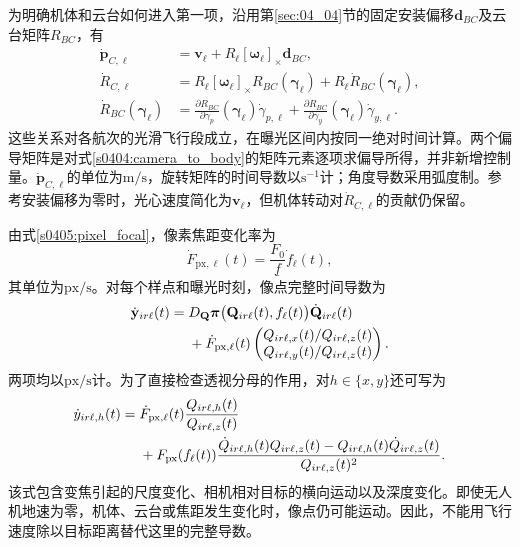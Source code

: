 为明确机体和云台如何进入第一项，沿用第\ref{sec:04_04}节的固定安装偏移$\mathbf d_{BC}$及云台矩阵$R_{BC}$，有
\begin{subequations}
\label{s0405:camera_pose_rates}
\begin{align}
 \dot{\mathbf p}_{C,\ell}
 &=\mathbf v_\ell
   +R_\ell[\boldsymbol\omega_\ell]_\times\mathbf d_{BC},
 \label{s0405:camera_translation_rate}\\
 \dot R_{C,\ell}
 &=R_\ell[\boldsymbol\omega_\ell]_\times
   R_{BC}(\boldsymbol\gamma_\ell)
   +R_\ell\dot R_{BC}(\boldsymbol\gamma_\ell),
 \label{s0405:camera_rotation_rate}\\
 \dot R_{BC}(\boldsymbol\gamma_\ell)
 &=\frac{\partial R_{BC}}{\partial\gamma_p}
      (\boldsymbol\gamma_\ell)\dot\gamma_{p,\ell}
  +\frac{\partial R_{BC}}{\partial\gamma_y}
      (\boldsymbol\gamma_\ell)\dot\gamma_{y,\ell}.
 \label{s0405:gimbal_rotation_rate}
\end{align}
\end{subequations}
这些关系对各航次的光滑飞行段成立，在曝光区间内按同一绝对时间计算。两个偏导矩阵是对式\eqref{s0404:camera_to_body}的矩阵元素逐项求偏导所得，并非新增控制量。$\dot{\mathbf p}_{C,\ell}$的单位为$\mathrm{m/s}$，旋转矩阵的时间导数以$\mathrm{s^{-1}}$计；角度导数采用弧度制。参考安装偏移为零时，光心速度简化为$\mathbf v_\ell$，但机体转动对$\dot R_{C,\ell}$的贡献仍保留。

由式\eqref{s0405:pixel_focal}，像素焦距变化率为
\begin{equation}
 \dot F_{\mathrm{px},\ell}(t)
 =\frac{F_0}{\underline f}\dot f_\ell(t),
 \label{s0405:pixel_focal_rate}
\end{equation}
其单位为$\mathrm{px/s}$。对每个样点和曝光时刻，像点完整时间导数为
\begin{align}
 \dot{\mathbf y}_{ir\ell}(t)
 ={}&D_{\mathbf Q}\boldsymbol\pi
       \bigl(\mathbf Q_{ir\ell}(t),f_\ell(t)\bigr)
       \dot{\mathbf Q}_{ir\ell}(t)\notag\\
 &+\dot F_{\mathrm{px},\ell}(t)
 \begin{pmatrix}
 Q_{ir\ell,x}(t)/Q_{ir\ell,z}(t)\\
 Q_{ir\ell,y}(t)/Q_{ir\ell,z}(t)
 \end{pmatrix}.
 \label{s0405:image_velocity}
\end{align}
两项均以$\mathrm{px/s}$计。为了直接检查透视分母的作用，对$h\in\{x,y\}$还可写为
\begin{align}
 \dot y_{ir\ell,h}(t)
 ={}&\dot F_{\mathrm{px},\ell}(t)
       \frac{Q_{ir\ell,h}(t)}{Q_{ir\ell,z}(t)}\notag\\
 &+F_{\mathrm{px}}(f_\ell(t))
 \frac{\dot Q_{ir\ell,h}(t)Q_{ir\ell,z}(t)
       -Q_{ir\ell,h}(t)\dot Q_{ir\ell,z}(t)}
      {Q_{ir\ell,z}(t)^2}.
 \label{s0405:image_velocity_components}
\end{align}
该式包含变焦引起的尺度变化、相机相对目标的横向运动以及深度变化。即使无人机地速为零，机体、云台或焦距发生变化时，像点仍可能运动。因此，不能用飞行速度除以目标距离替代这里的完整导数。

